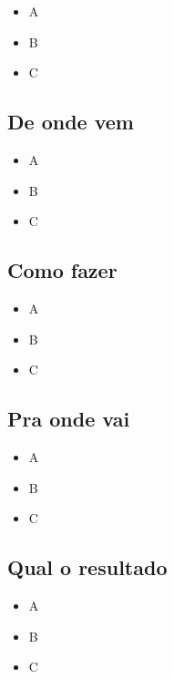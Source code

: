 \documentclass[
]{article}
\providecommand{\tightlist}{%
  \setlength{\itemsep}{0pt}\setlength{\parskip}{0pt}}
\begin{document}
\begin{itemize}
\tightlist
\item
  A
\item
  B
\item
  C
\end{itemize}

\hypertarget{de-onde-vem-7}{%
\subsection*{De onde vem}\label{de-onde-vem-7}}

\begin{itemize}
\tightlist
\item
  A
\item
  B
\item
  C
\end{itemize}

\hypertarget{como-fazer-7}{%
\subsection*{Como fazer}\label{como-fazer-7}}

\begin{itemize}
\tightlist
\item
  A
\item
  B
\item
  C
\end{itemize}

\hypertarget{pra-onde-vai-7}{%
\subsection*{Pra onde vai}\label{pra-onde-vai-7}}

\begin{itemize}
\tightlist
\item
  A
\item
  B
\item
  C
\end{itemize}

\hypertarget{qual-o-resultado-7}{%
\subsection*{Qual o resultado}\label{qual-o-resultado-7}}

\begin{itemize}
\tightlist
\item
  A
\item
  B
\item
  C
\end{itemize}
\end{document}
